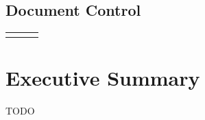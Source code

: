 \documentclass[12pt,twoside,a4paper]{report}
\begin{document}
\firstpage

\partnerpage


\newpage
\tableofcontents

\newpage
\section*{Document Control}

\begin{tabular}{*{3}{|p{.3\textwidth}}|}\hline
{} &
 &
\tabularnewline\hline
{} &  &  \tabularnewline\hline
\end{tabular}

\clearpage
{}

\chapter*{Executive Summary}
TODO 


%










\clearpage



\end{document}
